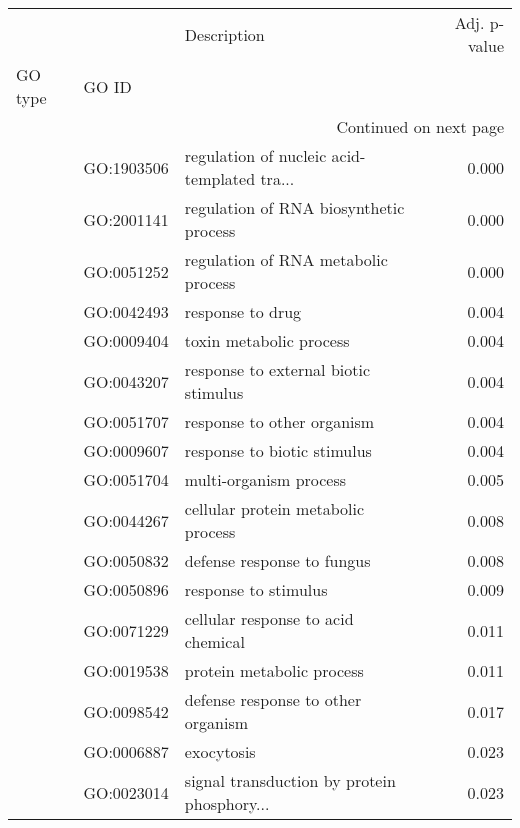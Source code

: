 \begin{longtable}{lllr}
\toprule
   &            &                                  Description &  Adj. p-value \\
GO type & GO ID &                                              &               \\
\midrule
\endhead
\midrule
\multicolumn{4}{r}{{Continued on next page}} \\
\midrule
\endfoot

\bottomrule
\endlastfoot
\multirow{34}{*}{BP} & GO:1903506 &  regulation of nucleic acid-templated tra... &         0.000 \\
   & GO:2001141 &       regulation of RNA biosynthetic process &         0.000 \\
   & GO:0051252 &          regulation of RNA metabolic process &         0.000 \\
   & GO:0042493 &                             response to drug &         0.004 \\
   & GO:0009404 &                      toxin metabolic process &         0.004 \\
   & GO:0043207 &         response to external biotic stimulus &         0.004 \\
   & GO:0051707 &                   response to other organism &         0.004 \\
   & GO:0009607 &                  response to biotic stimulus &         0.004 \\
   & GO:0051704 &                       multi-organism process &         0.005 \\
   & GO:0044267 &           cellular protein metabolic process &         0.008 \\
   & GO:0050832 &                   defense response to fungus &         0.008 \\
   & GO:0050896 &                         response to stimulus &         0.009 \\
   & GO:0071229 &           cellular response to acid chemical &         0.011 \\
   & GO:0019538 &                    protein metabolic process &         0.011 \\
   & GO:0098542 &           defense response to other organism &         0.017 \\
   & GO:0006887 &                                   exocytosis &         0.023 \\
   & GO:0023014 &  signal transduction by protein phosphory... &         0.023 \\

\end{longtable}
